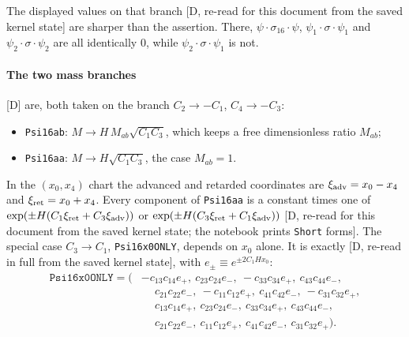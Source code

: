 The displayed values on that branch [D, re-read for this document from the saved kernel state]
are sharper than the assertion. There, $\psi\cdot\sigma_{16}\cdot\psi$,
$\psi_1\cdot\sigma\cdot\psi_1$ and $\psi_2\cdot\sigma\cdot\psi_2$ are all identically $0$, while
$\psi_2\cdot\sigma\cdot\psi_1$ is not.

\paragraph{The two mass branches} [D] are, both taken on the branch
$C_2\to-C_1$, $C_4\to-C_3$:
\begin{itemize}
  \item \texttt{Psi16ab}: $M\to H\,M_{ab}\sqrt{C_1C_3}$, which keeps a free dimensionless ratio
        $M_{ab}$;
  \item \texttt{Psi16aa}: $M\to H\sqrt{C_1C_3}$, the case $M_{ab}=1$.
\end{itemize}
In the $(x_0,x_4)$ chart the advanced and retarded coordinates are $\xi_{\rm adv}=x_0-x_4$ and
$\xi_{\rm ret}=x_0+x_4$. Every component of \texttt{Psi16aa} is a constant times one of
$\exp(\pm H(C_1\xi_{\rm ret}+C_3\xi_{\rm adv}))$ or $\exp(\pm H(C_3\xi_{\rm ret}+C_1\xi_{\rm adv}))$
[D, re-read for this document from the saved kernel state; the notebook prints \texttt{Short}
forms]. The special case $C_3\to C_1$, \texttt{Psi16x0ONLY}, depends on $x_0$ alone. It is
exactly [D, re-read in full from the saved kernel state], with $e_\pm \equiv e^{\pm 2C_1Hx_0}$:
\begin{align*}
\texttt{Psi16x0ONLY}=\bigl(&{-c_{13}c_{14}e_+},\ c_{23}c_{24}e_-,\ -c_{33}c_{34}e_+,\ c_{43}c_{44}e_-,\\
&\phantom{-}c_{21}c_{22}e_-,\ -c_{11}c_{12}e_+,\ c_{41}c_{42}e_-,\ -c_{31}c_{32}e_+,\\
&\phantom{-}c_{13}c_{14}e_+,\ c_{23}c_{24}e_-,\ c_{33}c_{34}e_+,\ c_{43}c_{44}e_-,\\
&\phantom{-}c_{21}c_{22}e_-,\ c_{11}c_{12}e_+,\ c_{41}c_{42}e_-,\ c_{31}c_{32}e_+\bigr).
\end{align*}

